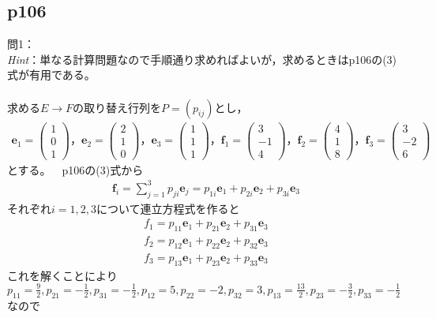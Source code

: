 \documentclass[dvipdfmx,uplatex,11pt]{jsarticle}
\begin{document}
\subsection{p106}
\noindent
問1：\\
\textsl{Hint}：単なる計算問題なので手順通り求めればよいが，求めるときはp106の(3)式が有用である。\\ \\
求める$E→F$の取り替え行列を$P=(p_{ij})$とし，
\begin{eqnarray*}
\bm{e}_1=
\begin{pmatrix}
1 \\
0 \\
1
\end{pmatrix}
，
\bm{e}_2=
\begin{pmatrix}
2 \\
1 \\
0
\end{pmatrix}
，
\bm{e}_3=
\begin{pmatrix}
1 \\
1 \\
1
\end{pmatrix}
，
\bm{f}_1=
\begin{pmatrix}
3 \\
-1 \\
4
\end{pmatrix}
，
\bm{f}_2=
\begin{pmatrix}
4 \\
1 \\
8
\end{pmatrix}
，
\bm{f}_3=
\begin{pmatrix}
3 \\
-2 \\
6
\end{pmatrix}
\end{eqnarray*}
とする。~~p106の(3)式から
\begin{eqnarray*}
\bm{f}_i=\sum^{3}_{j=1}p_{ji}\bm{e}_{j}=p_{1i}\bm{e}_1+p_{2i}\bm{e}_2+p_{3i}\bm{e}_3
\end{eqnarray*}
それぞれ$i=1,2,3$について連立方程式を作ると
\begin{eqnarray*}
f_1=p_{11}\bm{e}_1+p_{21}\bm{e}_2+p_{31}\bm{e}_3 \\
f_2=p_{12}\bm{e}_1+p_{22}\bm{e}_2+p_{32}\bm{e}_3 \\
f_3=p_{13}\bm{e}_1+p_{23}\bm{e}_2+p_{33}\bm{e}_3
\end{eqnarray*}
これを解くことにより$p_{11}=\frac{9}{2},p_{21}=-\frac{1}{2},p_{31}=-\frac{1}{2},p_{12}=5,p_{22}=-2,p_{32}=3,p_{13}=\frac{13}{2},p_{23}=-\frac{3}{2},p_{33}=-\frac{1}{2}$なので
\end{document}
